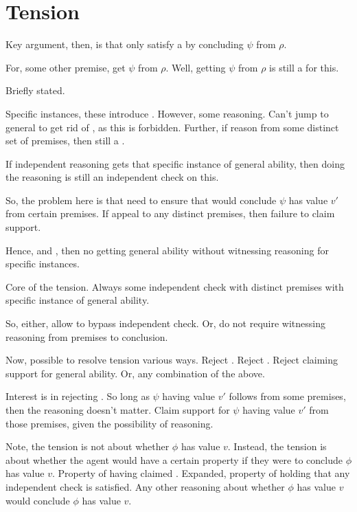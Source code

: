 \section{Tension}
\label{sec:tension}

\begin{note}
  Key argument, then, is that only satisfy a \requ{} by concluding \(\psi\) from \(\rho\).

  For, some other premise, get \(\psi\) from \(\rho\).
  Well, getting \(\psi\) from \(\rho\) is still a \requ{} for this.
\end{note}

\begin{note}
  Briefly stated.

  Specific instances, these introduce \requ{}.
  However, some reasoning.
  Can't jump to general to get rid of \requ{}, as this is forbidden.
  Further, if reason from some distinct set of premises, then still a \requ{}.

  If independent reasoning gets that specific instance of general ability, then doing the reasoning is still an independent check on this.

  So, the problem here is that need to ensure that would conclude \(\psi\) has value \(v'\) from certain premises.
  If appeal to any distinct premises, then failure to claim support.

  Hence, \ESU{} and \ideaCS{}, then no getting general ability without witnessing reasoning for specific instances.

  Core of the tension.
  Always some independent check with distinct premises with specific instance of general ability.

  So, either, allow to bypass independent check.
  Or, do not require witnessing reasoning from premises to conclusion.
\end{note}

\begin{note}
  Now, possible to resolve tension various ways.
  Reject \ideaCS{}.
  Reject \ESU{}.
  Reject claiming support for general ability.
  Or, any combination of the above.

  Interest is in rejecting \ESU{}.
  So long as \(\psi\) having value \(v'\) follows from some premises, then the reasoning doesn't matter.
  Claim support for \(\psi\) having value \(v'\) from those premises, given the possibility of reasoning.
\end{note}

\begin{note}
  Note, the tension is not about whether \(\phi\) has value \(v\).
  Instead, the tension is about whether the agent would have a certain property if they were to conclude \(\phi\) has value \(v\).
  Property of having claimed \support{}.
  Expanded, property of holding that any independent check is satisfied.
  Any other reasoning about whether \(\phi\) has value \(v\) would conclude \(\phi\) has value \(v\).
\end{note}

